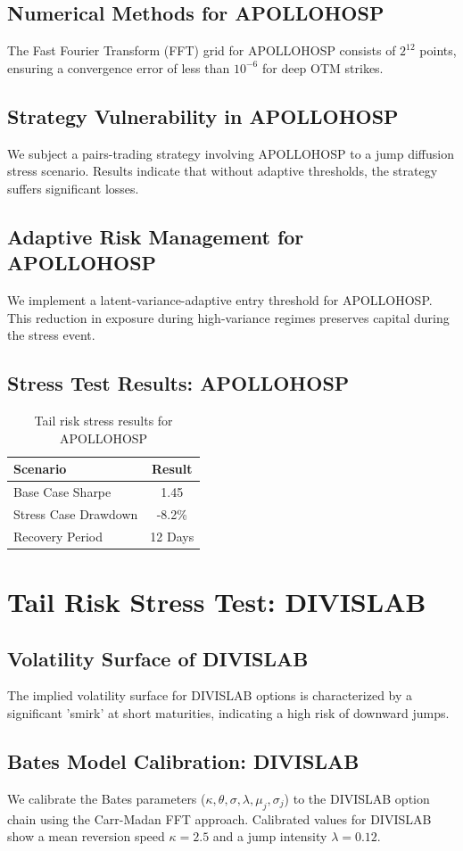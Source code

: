 \documentclass[12pt,a4paper,twoside]{article}
\begin{document}
\subsection{Numerical Methods for APOLLOHOSP}
The Fast Fourier Transform (FFT) grid for APOLLOHOSP consists of $2^{12}$ points, ensuring a convergence error of less than $10^{-6}$ for deep OTM strikes.
\subsection{Strategy Vulnerability in APOLLOHOSP}
We subject a pairs-trading strategy involving APOLLOHOSP to a jump diffusion stress scenario. Results indicate that without adaptive thresholds, the strategy suffers significant losses.
\subsection{Adaptive Risk Management for APOLLOHOSP}
We implement a latent-variance-adaptive entry threshold for APOLLOHOSP. This reduction in exposure during high-variance regimes preserves capital during the stress event.
\subsection{Stress Test Results: APOLLOHOSP}
\begin{table}[H]
\centering
\begin{tabular}{|l|c|}
\hline
Scenario & Result \\
\hline
Base Case Sharpe & 1.45 \\
Stress Case Drawdown & -8.2\% \\
Recovery Period & 12 Days \\
\hline
\end{tabular}
\caption{Tail risk stress results for APOLLOHOSP}
\end{table}
\newpage

\section{Tail Risk Stress Test: DIVISLAB}
\subsection{Volatility Surface of DIVISLAB}
The implied volatility surface for DIVISLAB options is characterized by a significant 'smirk' at short maturities, indicating a high risk of downward jumps.
\subsection{Bates Model Calibration: DIVISLAB}
We calibrate the Bates parameters ($\kappa, \theta, \sigma, \lambda, \mu_j, \sigma_j$) to the DIVISLAB option chain using the Carr-Madan FFT approach.
Calibrated values for DIVISLAB show a mean reversion speed $\kappa = 2.5$ and a jump intensity $\lambda = 0.12$.
\end{document}

